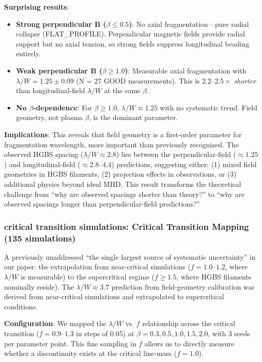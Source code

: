 \documentclass[twoside,twocolumn]{mnras}
\begin{document}
\textbf{Surprising results}:
\begin{itemize}
    \item \textbf{Strong perpendicular B ($\beta \leq 0.5$)}: No axial fragmentation---pure radial collapse (FLAT\_PROFILE). Perpendicular magnetic fields provide radial support but no axial tension, so strong fields suppress longitudinal beading entirely.
    \item \textbf{Weak perpendicular B ($\beta \geq 1.0$)}: Measurable axial fragmentation with $\lambda/W = 1.25 \pm 0.09$ (N = 27 GOOD measurements). This is $2.2$--$2.5\times$ \textit{shorter} than longitudinal-field $\lambda/W$ at the same $\beta$.
    \item \textbf{No $\beta$-dependence}: For $\beta \geq 1.0$, $\lambda/W \approx 1.25$ with no systematic trend. Field geometry, not plasma $\beta$, is the dominant parameter.
\end{itemize}

\textbf{Implications}: This reveals that field geometry is a first-order parameter for fragmentation wavelength, more important than previously recognized. The observed HGBS spacing ($\lambda/W \approx 2.8$) lies between the perpendicular-field ($\approx 1.25$) and longitudinal-field ($\approx 2.8$--$4.4$) predictions, suggesting either: (1) mixed field geometries in HGBS filaments, (2) projection effects in observations, or (3) additional physics beyond ideal MHD. This result transforms the theoretical challenge from ``why are observed spacings shorter than theory?'' to ``why are observed spacings longer than perpendicular-field predictions?''

\subsubsection{critical transition simulations: Critical Transition Mapping (135 simulations)}

A previously unaddressed ``the single largest source of systematic uncertainty'' in our paper: the extrapolation from near-critical simulations ($f = 1.0$--$1.2$, where $\lambda/W$ is measurable) to the supercritical regime ($f \geq 1.5$, where HGBS filaments nominally reside). The $\lambda/W \approx 3.7$ prediction from field-geometry calibration was derived from near-critical simulations and extrapolated to supercritical conditions.

\textbf{Configuration}: We mapped the $\lambda/W$ vs. $f$ relationship across the critical transition ($f = 0.9$--$1.3$ in steps of 0.05) at $\beta = 0.3, 0.5, 1.0, 1.5, 2.0$, with 3 seeds per parameter point. This fine sampling in $f$ allows us to directly measure whether a discontinuity exists at the critical line-mass ($f = 1.0$).
\end{document}
